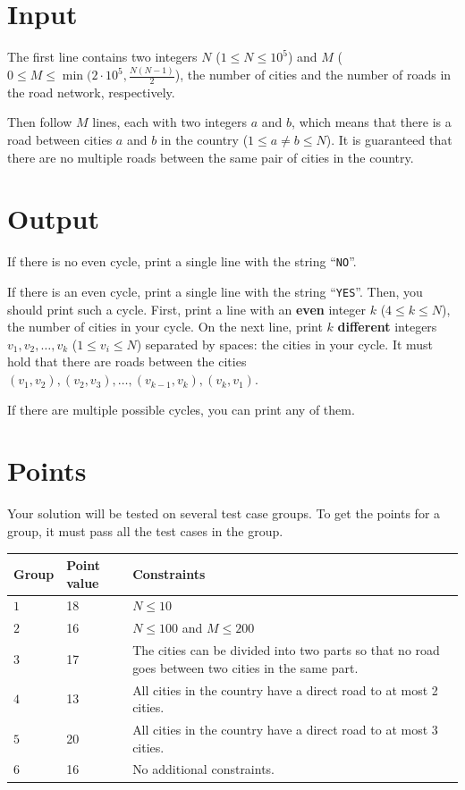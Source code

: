 \section*{Input}
The first line contains two integers $N$ ($1 \le N \le 10^5$) and $M$ ($0 \le M \le \min(2 \cdot 10^5, \frac{N(N-1)}{2}$), the number of cities and the number of roads in the road network, respectively.

Then follow $M$ lines, each with two integers $a$ and $b$, which means that there is a road between cities $a$ and $b$ in the country ($1 \le a \neq b \le N$).
It is guaranteed that there are no multiple roads between the same pair of cities in the country.

\section*{Output}
If there is no even cycle, print a single line with the string ``\texttt{NO}''.

If there is an even cycle, print a single line with the string ``\texttt{YES}''.
Then, you should print such a cycle.
First, print a line with an \textbf{even} integer $k$ ($4 \le k \le N$), the number of cities in your cycle.
On the next line, print $k$ \textbf{different} integers $v_{1}, v_{2}, \ldots, v_{k}$ ($1 \le v_{i} \le N$) separated by spaces: the cities in your cycle.
It must hold that there are roads between the cities $(v_{1}, v_{2}), (v_{2}, v_{3}), \ldots, (v_{k-1}, v_{k}), (v_{k}, v_{1})$.

If there are multiple possible cycles, you can print any of them.

\section*{Points}
Your solution will be tested on several test case groups.
To get the points for a group, it must pass all the test cases in the group.

\noindent
\begin{tabular}{| l | l | l |}
  \hline
  \textbf{Group} & \textbf{Point value} & \textbf{Constraints} \\ \hline
  $1$ & 18 & $N \le 10$ \\ \hline
  $2$ & 16 & $N \le 100$ and $M \le 200$ \\ \hline
  $3$ & 17 & The cities can be divided into two parts so that no road goes between two cities in the same part. \\ \hline
  $4$ & 13 & All cities in the country have a direct road to at most 2 cities. \\ \hline
  $5$ & 20 & All cities in the country have a direct road to at most 3 cities. \\ \hline
  $6$ & 16 & No additional constraints. \\ \hline
\end{tabular}


